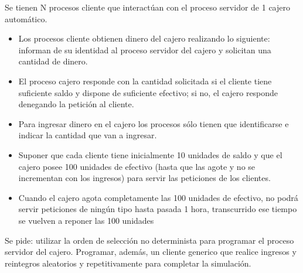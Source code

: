 \documentclass[12pt]{article}
\begin{document}
\begin{description}
            \begin{ejercicio}
                Se tienen N procesos cliente que interactúan con el proceso servidor de 1 cajero automático.
                \begin{itemize}
                    \item Los procesos cliente obtienen dinero del cajero realizando lo siguiente: informan de su identidad al proceso servidor del cajero y solicitan una cantidad de dinero.
                    \item El proceso cajero responde con la cantidad solicitada si el cliente tiene suficiente saldo y dispone de suficiente efectivo; si no, el cajero responde denegando la petición al cliente.
                    \item Para ingresar dinero en el cajero los procesos sólo tienen que identificarse e indicar la cantidad que van a ingresar.
                    \item Suponer que cada cliente tiene inicialmente 10 unidades de saldo y que el cajero posee 100 unidades de efectivo (hasta que las agote y no se incrementan con los ingresos) para servir las peticiones de los clientes.
                    \item Cuando el cajero agota completamente las 100 unidades de efectivo, no podrá servir peticiones de ningún tipo hasta pasada 1 hora, transcurrido ese tiempo se vuelven a reponer las 100 unidades
                \end{itemize}
                Se pide: utilizar la orden de selección no determinista para programar el proceso servidor del cajero. Programar, además, un cliente generico que realice ingresos y reintegros aleatorios y repetitivamente para completar la simulación.
            \end{ejercicio}
    \end{description}

\end{document}
